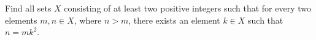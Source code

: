Find all sets $X$ consisting of at least two positive integers such that for every two elements $m,n\in X$,  where $n>m$,  there exists an element $k\in X$ such that $n=mk^2$.